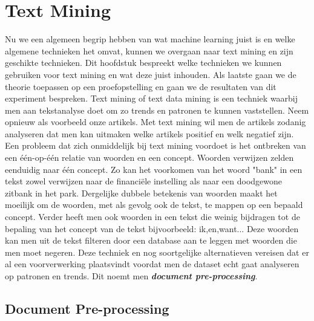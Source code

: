 \chapter{Text Mining}\label{Text Mining}

Nu we een algemeen begrip hebben van wat machine learning juist is en welke algemene technieken het omvat, kunnen we overgaan naar text mining en zijn geschikte technieken. Dit hoofdstuk bespreekt welke technieken we kunnen gebruiken voor text mining en wat deze juist inhouden. Als laatste gaan we de theorie toepassen op een proefopstelling en gaan we de resultaten van dit experiment bespreken. 
\newline
%
Text mining of text data mining is een techniek waarbij men aan tekstanalyse doet om zo trends en patronen te kunnen vaststellen. Neem opnieuw als voorbeeld onze artikels. Met text mining wil men de artikels zodanig analyseren dat men kan uitmaken welke artikels positief en welk negatief zijn.
Een probleem dat zich onmiddelijk bij text mining voordoet is het ontbreken van een  \'e\'en-op-\'e\'en relatie van woorden en een concept. Woorden verwijzen zelden eenduidig naar \'e\'en concept. Zo kan het voorkomen van het woord "bank" in een tekst zowel verwijzen naar de financi\"ele instelling als naar een doodgewone zitbank in het park. Dergelijke dubbele betekenis van woorden maakt het moeilijk om de woorden, met als gevolg ook de tekst, te mappen op een bepaald concept.
% 
Verder heeft men ook woorden in een tekst die weinig bijdragen tot de bepaling van het concept van de tekst bijvoorbeeld: ik,en,want...
Deze woorden kan men uit de tekst filteren door een database aan te leggen met woorden die men moet negeren. Deze techniek en nog soortgelijke alternatieven vereisen dat er al een voorverwerking plaatsvindt voordat men de dataset echt gaat analyseren op patronen en trends. Dit noemt men \textbf{\textit{document pre-processing}}.

\section{Document Pre-processing }\label{Document Pre-processing}

